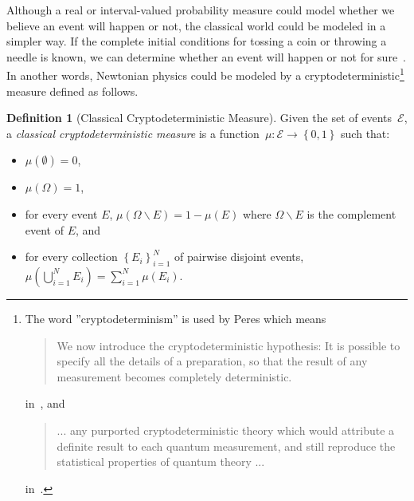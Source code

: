 \documentclass[12pt]{iopart}
\theoremstyle{plain}
\theoremstyle{definition}
\newtheorem{definition}[thm]{Definition}
\newcommand{\events}{\ensuremath{\mathcal{E}}}
\newcommand{\pmeas}{\ensuremath{\mu}}
\begin{document}
Although a real or interval-valued probability measure could model
whether we believe an event will happen or not, the classical world
could be modeled in a simpler way. If the complete initial conditions
for tossing a coin or throwing a needle is known, we can determine
whether an event will happen or not for sure~\cite{DiaconisHolmesMontgomery2007}.
In another words, Newtonian physics could be modeled by a cryptodeterministic\footnote{The word ''cryptodeterminism'' is used by Peres which means
\begin{quote}
We now introduce the cryptodeterministic hypothesis: It is possible
to specify all the details of a preparation, so that the result of
any measurement becomes completely deterministic.
\end{quote}
in~\cite{PeresRon1988}, and
\begin{quote}
... any purported cryptodeterministic theory which would attribute
a definite result to each quantum measurement, and still reproduce
the statistical properties of quantum theory ...
\end{quote}
in~\cite{Peres1991,peres1995quantum}.} measure defined as follows.

\begin{definition}[Classical Cryptodeterministic Measure]\label{def:CryptodeterministicMeasures}Given
the set of events~$\events$, a \emph{classical cryptodeterministic
measure} is a function~$\pmeas:\events\rightarrow\left\{ 0,1\right\} $
such that: 
\begin{itemize}
\item $\pmeas(\emptyset)=0$, 
\item $\pmeas(\Omega)=1$, 
\item for every event $E$, $\pmeas\left(\Omega\backslash E\right)=1-\pmeas\left(E\right)$
where $\Omega\backslash E$ is the complement event of $E$, and 
\item for every collection $\left\{ E_{i}\right\} _{i=1}^{N}$ of pairwise
disjoint events, $\pmeas\left(\bigcup_{i=1}^{N}E_{i}\right)=\sum_{i=1}^{N}\pmeas(E_{i})$. 
\end{itemize}
\end{definition}
\end{document}
